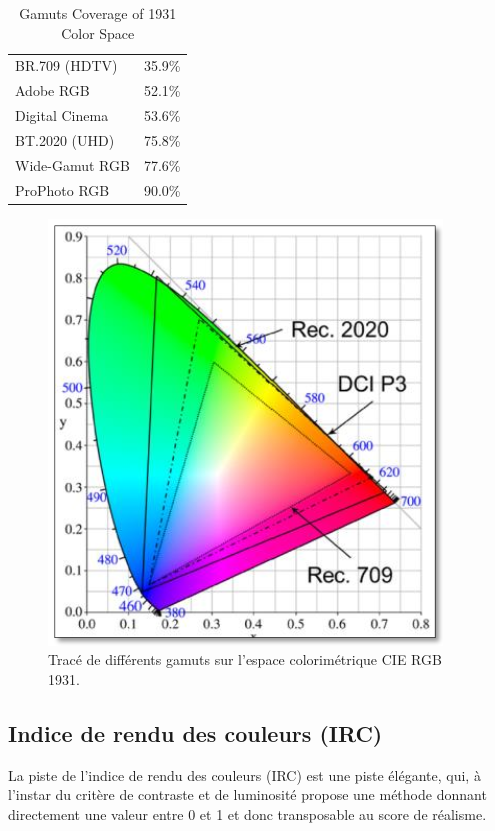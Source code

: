 	\begin{table}[h]	
		\centering
		\caption{Gamuts Coverage of 1931 Color Space}
		\label{tab:gamut}
		\small
		\begin{tabular}{ll}
			BR.709 (HDTV) & 35.9\%\\
			Adobe RGB & 52.1\%\\
			Digital Cinema & 53.6\%\\
			BT.2020 (UHD) & 75.8\%\\
			Wide-Gamut RGB & 77.6\%\\
			ProPhoto RGB & 90.0\%\\
		\end{tabular}
	\end{table}
	
	\begin{figure}[h]
		\centering
		\includegraphics[scale=.9]{Figures/GamutBT2020}
		\caption{Tracé de différents gamuts sur l'espace colorimétrique CIE RGB 1931.}
		\label{fig:multi_gamut}
	\end{figure}
	
	\subsection{Indice de rendu des couleurs (IRC)}
	\par La piste de l'indice de rendu des couleurs (IRC) est une piste élégante, qui, à l'instar du critère de contraste et de luminosité propose une méthode donnant directement une valeur entre 0 et 1 et donc transposable au score de réalisme.
	

